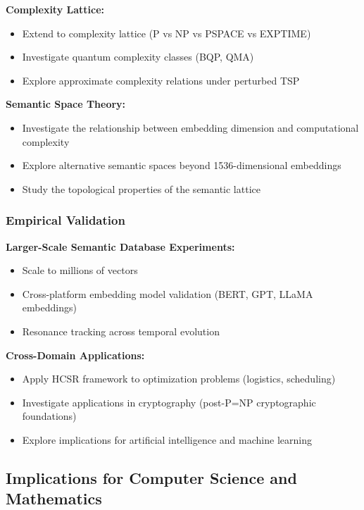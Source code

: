 \documentclass[11pt, letterpaper]{article}
\begin{document}
\textbf{Complexity Lattice:}
\begin{itemize}
    \item Extend to complexity lattice (P vs NP vs PSPACE vs EXPTIME)
    \item Investigate quantum complexity classes (BQP, QMA)
    \item Explore approximate complexity relations under perturbed TSP
\end{itemize}

\textbf{Semantic Space Theory:}
\begin{itemize}
    \item Investigate the relationship between embedding dimension and computational complexity
    \item Explore alternative semantic spaces beyond 1536-dimensional embeddings
    \item Study the topological properties of the semantic lattice
\end{itemize}

\subsubsection{Empirical Validation}

\textbf{Larger-Scale Semantic Database Experiments:}
\begin{itemize}
    \item Scale to millions of vectors
    \item Cross-platform embedding model validation (BERT, GPT, LLaMA embeddings)
    \item Resonance tracking across temporal evolution
\end{itemize}

\textbf{Cross-Domain Applications:}
\begin{itemize}
    \item Apply HCSR framework to optimization problems (logistics, scheduling)
    \item Investigate applications in cryptography (post-P=NP cryptographic foundations)
    \item Explore implications for artificial intelligence and machine learning
\end{itemize}

\subsection{Implications for Computer Science and Mathematics}
\end{document}
